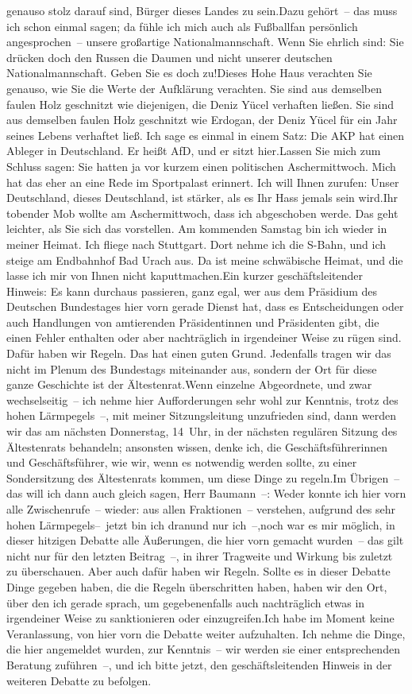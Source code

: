 \documentclass{article}
\begin{document}
genauso stolz darauf sind, Bürger dieses Landes zu sein.Dazu gehört – das muss ich schon einmal sagen; da fühle ich mich auch als Fußballfan persönlich angesprochen – unsere großartige Nationalmannschaft. Wenn Sie ehrlich sind: Sie drücken doch den Russen die Daumen und nicht unserer deutschen Nationalmannschaft. Geben Sie es doch zu!Dieses Hohe Haus verachten Sie genauso, wie Sie die Werte der Aufklärung verachten. Sie sind aus demselben faulen Holz geschnitzt wie diejenigen, die Deniz Yücel verhaften ließen. Sie sind aus demselben faulen Holz geschnitzt wie Erdogan, der Deniz Yücel für ein Jahr seines Lebens verhaftet ließ. Ich sage es einmal in einem Satz: Die AKP hat einen Ableger in Deutschland. Er heißt AfD, und er sitzt hier.Lassen Sie mich zum Schluss sagen: Sie hatten ja vor kurzem einen politischen Aschermittwoch. Mich hat das eher an eine Rede im Sportpalast erinnert. Ich will Ihnen zurufen: Unser Deutschland, dieses Deutschland, ist stärker, als es Ihr Hass jemals sein wird.Ihr tobender Mob wollte am Aschermittwoch, dass ich abgeschoben werde. Das geht leichter, als Sie sich das vorstellen. Am kommenden Samstag bin ich wieder in meiner Heimat. Ich fliege nach Stuttgart. Dort nehme ich die S-Bahn, und ich steige am Endbahnhof Bad Urach aus. Da ist meine schwäbische Heimat, und die lasse ich mir von Ihnen nicht kaputtmachen.Ein kurzer geschäftsleitender Hinweis: Es kann durchaus passieren, ganz egal, wer aus dem Präsidium des Deutschen Bundestages hier vorn gerade Dienst hat, dass es Entscheidungen oder auch Handlungen von amtierenden Präsidentinnen und Präsidenten gibt, die einen Fehler enthalten oder aber nachträglich in irgendeiner Weise zu rügen sind. Dafür haben wir Regeln. Das hat einen guten Grund. Jedenfalls tragen wir das nicht im Plenum des Bundestags miteinander aus, sondern der Ort für diese ganze Geschichte ist der Ältestenrat.Wenn einzelne Abgeordnete, und zwar wechselseitig – ich nehme hier Aufforderungen sehr wohl zur Kenntnis, trotz des hohen Lärmpegels –, mit meiner Sitzungsleitung unzufrieden sind, dann werden wir das am nächsten Donnerstag, 14 Uhr, in der nächsten regulären Sitzung des Ältestenrats behandeln; ansonsten wissen, denke ich, die Geschäftsführerinnen und Geschäftsführer, wie wir, wenn es notwendig werden sollte, zu einer Sondersitzung des Ältestenrats kommen, um diese Dinge zu regeln.Im Übrigen – das will ich dann auch gleich sagen, Herr Baumann –: Weder konnte ich hier vorn alle Zwischenrufe – wieder: aus allen Fraktionen – verstehen, aufgrund des sehr hohen Lärmpegels– jetzt bin ich dranund nur ich –,noch war es mir möglich, in dieser hitzigen Debatte alle Äußerungen, die hier vorn gemacht wurden – das gilt nicht nur für den letzten Beitrag –, in ihrer Tragweite und Wirkung bis zuletzt zu überschauen. Aber auch dafür haben wir Regeln. Sollte es in dieser Debatte Dinge gegeben haben, die die Regeln überschritten haben, haben wir den Ort, über den ich gerade sprach, um gegebenenfalls auch nachträglich etwas in irgendeiner Weise zu sanktionieren oder einzugreifen.Ich habe im Moment keine Veranlassung, von hier vorn die Debatte weiter aufzuhalten. Ich nehme die Dinge, die hier angemeldet wurden, zur Kenntnis – wir werden sie einer entsprechenden Beratung zuführen –, und ich bitte jetzt, den geschäftsleitenden Hinweis in der weiteren Debatte zu befolgen.
\end{document}
